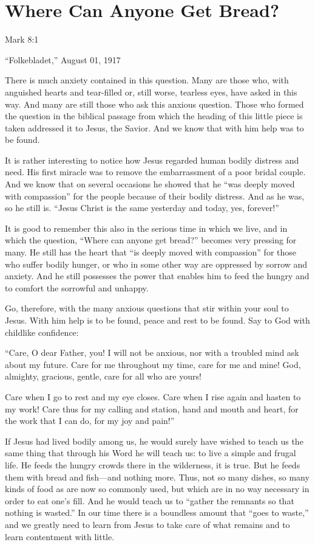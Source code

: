 
\section{Where Can Anyone Get Bread?}

Mark 8:1

“Folkebladet,” August 01, 1917

There is much anxiety contained in this question. Many are those who, with anguished hearts and tear-filled or, still worse, tearless eyes, have asked in this way. And many are still those who ask this anxious question. Those who formed the question in the biblical passage from which the heading of this little piece is taken addressed it to Jesus, the Savior. And we know that with him help was to be found.

It is rather interesting to notice how Jesus regarded human bodily distress and need. His first miracle was to remove the embarrassment of a poor bridal couple. And we know that on several occasions he showed that he “was deeply moved with compassion” for the people because of their bodily distress. And as he was, so he still is. “Jesus Christ is the same yesterday and today, yes, forever!”

It is good to remember this also in the serious time in which we live, and in which the question, “Where can anyone get bread?” becomes very pressing for many. He still has the heart that “is deeply moved with compassion” for those who suffer bodily hunger, or who in some other way are oppressed by sorrow and anxiety. And he still possesses the power that enables him to feed the hungry and to comfort the sorrowful and unhappy.

Go, therefore, with the many anxious questions that stir within your soul to Jesus. With him help is to be found, peace and rest to be found. Say to God with childlike confidence:

“Care, O dear Father, you!
I will not be anxious,
nor with a troubled mind
ask about my future.
Care for me throughout my time,
care for me and mine!
God, almighty, gracious, gentle,
care for all who are yours!

Care when I go to rest
and my eye closes.
Care when I rise again
and hasten to my work!
Care thus for my calling and station,
hand and mouth and heart,
for the work that I can do,
for my joy and pain!”

If Jesus had lived bodily among us, he would surely have wished to teach us the same thing that through his Word he will teach us: to live a simple and frugal life. He feeds the hungry crowds there in the wilderness, it is true. But he feeds them with bread and fish—and nothing more. Thus, not so many dishes, so many kinds of food as are now so commonly used, but which are in no way necessary in order to eat one’s fill. And he would teach us to “gather the remnants so that nothing is wasted.” In our time there is a boundless amount that “goes to waste,” and we greatly need to learn from Jesus to take care of what remains and to learn contentment with little.

